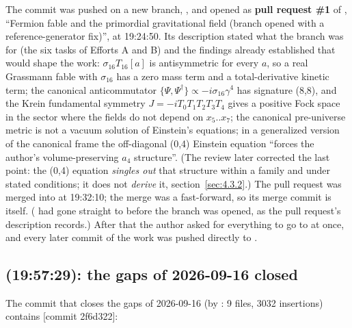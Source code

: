 The commit was pushed on a new branch, , and opened as \textbf{pull request \#1} of , ``Fermion fable and the primordial gravitational field (branch opened with a reference-generator fix)'', at 19:24:50. Its description stated what the branch was for (the six tasks of Efforts A and B) and the findings already established that would shape the work: $\sigma_{16} T_{16}[a]$ is antisymmetric for every $a$, so a real Grassmann fable with $\sigma_{16}$ has a zero mass term and a total-derivative kinetic term; the canonical anticommutator $\{\Psi, \Psi^{\dagger}\} \propto -i \sigma_{16} \gamma^{4}$ has signature (8,8), and the Krein fundamental symmetry $J = -i T_0 T_{1} T_{2} T_{3} T_{4}$ gives a positive Fock space in the sector where the fields do not depend on $x_5..x_7$; the canonical pre-universe metric is not a vacuum solution of Einstein's equations; in a generalized version of the canonical frame the off-diagonal (0,4) Einstein equation ``forces the author's volume-preserving $a_{4}$ structure''. (The review later corrected the last point: the (0,4) equation \emph{singles out} that structure within a family and under stated conditions; it does not \emph{derive} it, section~\ref{sec:4.3.2}.) The pull request was merged into  at 19:32:10; the merge was a fast-forward, so its merge commit is  itself. ( had gone straight to  before the branch was opened, as the pull request's description records.) After that the author asked for everything to go to  at once, and every later commit of the work was pushed directly to .

\subsection{\texorpdfstring{}{2f6d322} (19:57:29): the gaps of 2026-09-16 closed}
\label{sec:2.3}

The commit that closes the gaps of 2026-09-16 (by : 9 files, 3032 insertions) contains [commit 2f6d322]:

